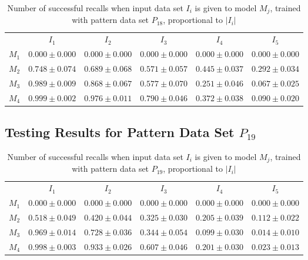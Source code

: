 \documentclass[12pt]{article}
\begin{document}
\begin{appendices}
\begin{table}[H]
\begin{tabular}{cccccc}
 & $I_{1}$  & $I_{2}$  & $I_{3}$  & $I_{4}$  & $I_{5}$ \\ \cline{2-6}
$M_{1}$  & $0.000\pm0.000$  & $0.000\pm0.000$  & $0.000\pm0.000$  & $0.000\pm0.000$  & $0.000\pm0.000$ \\
$M_{2}$  & $0.748\pm0.074$  & $0.689\pm0.068$  & $0.571\pm0.057$  & $0.445\pm0.037$  & $0.292\pm0.034$ \\
$M_{3}$  & $0.989\pm0.009$  & $0.868\pm0.067$  & $0.577\pm0.070$  & $0.251\pm0.046$  & $0.067\pm0.025$ \\
$M_{4}$  & $0.999\pm0.002$  & $0.976\pm0.011$  & $0.790\pm0.046$  & $0.372\pm0.038$  & $0.090\pm0.020$ \\

    \end{tabular}
    \caption{Number of successful recalls when input data set $I_i$ is given to model $M_j$, trained with pattern data set $P_{18}$, proportional to $\left|I_i\right|$}
    \end{table}
    
\subsection{Testing Results for Pattern Data Set $P_{19}$}


    \begin{table}[H]
    \centering
    \def\arraystretch{1.5}
    \footnotesize
    \begin{tabular}{cccccc}
    
 & $I_{1}$  & $I_{2}$  & $I_{3}$  & $I_{4}$  & $I_{5}$ \\ \cline{2-6}
$M_{1}$  & $0.000\pm0.000$  & $0.000\pm0.000$  & $0.000\pm0.000$  & $0.000\pm0.000$  & $0.000\pm0.000$ \\
$M_{2}$  & $0.518\pm0.049$  & $0.420\pm0.044$  & $0.325\pm0.030$  & $0.205\pm0.039$  & $0.112\pm0.022$ \\
$M_{3}$  & $0.969\pm0.014$  & $0.728\pm0.036$  & $0.344\pm0.054$  & $0.099\pm0.030$  & $0.014\pm0.010$ \\
$M_{4}$  & $0.998\pm0.003$  & $0.933\pm0.026$  & $0.607\pm0.046$  & $0.201\pm0.030$  & $0.023\pm0.013$ \\

    \end{tabular}
    \caption{Number of successful recalls when input data set $I_i$ is given to model $M_j$, trained with pattern data set $P_{19}$, proportional to $\left|I_i\right|$}
    \end{table}
    

\end{appendices}
\end{document}

